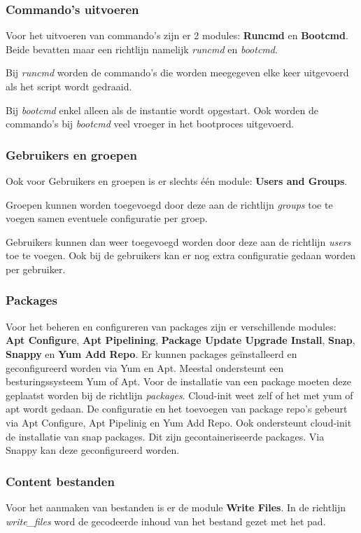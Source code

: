 \subsubsection{Commando's uitvoeren}
Voor het uitvoeren van commando's zijn er 2 modules: \textbf{Runcmd} en \textbf{Bootcmd}. Beide bevatten maar een richtlijn namelijk \textit{runcmd} en \textit{bootcmd}. 

Bij \textit{runcmd} worden de commando's die worden meegegeven elke keer uitgevoerd als het script wordt gedraaid. 

Bij \textit{bootcmd} enkel alleen als de instantie wordt opgestart. Ook worden de commando's bij \textit{bootcmd} veel vroeger in het bootproces uitgevoerd.

\subsubsection{Gebruikers en groepen}
Ook voor Gebruikers en groepen is er slechts één module: \textbf{Users and Groups}. 

Groepen kunnen worden toegevoegd door deze aan de richtlijn \textit{groups} toe te voegen samen eventuele configuratie per groep. 

Gebruikers kunnen dan weer toegevoegd worden door deze aan de richtlijn \textit{users} toe te voegen. Ook bij de gebruikers kan er nog extra configuratie gedaan worden per gebruiker.

\subsubsection{Packages}
Voor het beheren en configureren van packages zijn er verschillende modules: \textbf{Apt Configure}, \textbf{Apt Pipelining}, \textbf{Package Update Upgrade Install}, \textbf{Snap}, \textbf{Snappy} en \textbf{Yum Add Repo}. Er kunnen packages geïnstalleerd en geconfigureerd worden via Yum en Apt. Meestal ondersteunt een besturingssysteem Yum of Apt. Voor de installatie van een package moeten deze geplaatst worden bij de richtlijn \textit{packages}. Cloud-init weet zelf of het met yum of apt wordt gedaan. De configuratie en het toevoegen van package repo's gebeurt via Apt Configure, Apt Pipelinig en Yum Add Repo. Ook ondersteunt cloud-init de installatie van snap packages. Dit zijn gecontaineriseerde packages. Via Snappy kan deze geconfigureerd worden.

\subsubsection{Content bestanden}
Voor het aanmaken van bestanden is er de module \textbf{Write Files}. In de richtlijn \textit{write\_files} word de gecodeerde inhoud van het bestand gezet met het pad.

